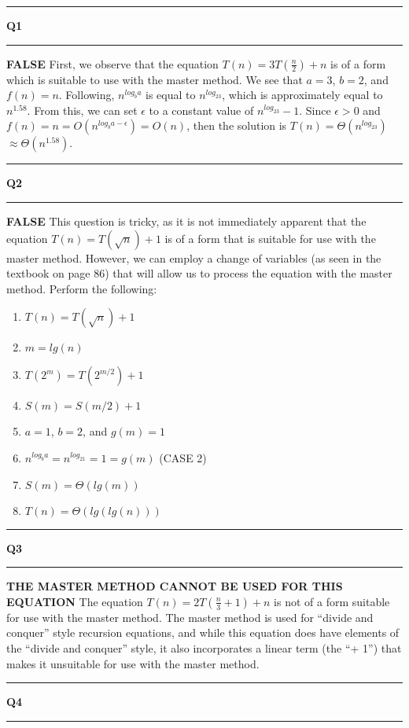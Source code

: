 \documentclass[11pt]{article}
\newcommand\question[2]{\vspace{.25in}\hrule\textbf{#1 #2}\vspace{.5em}\hrule\vspace{.10in}}
\begin{document}
\raggedright
\newcommand\NAME{Sean Connor (443-414-5111)}  %
\newcommand\HWNUM{2}              %

\question{Q1}{}
\textbf{FALSE} First, we observe that the equation $T(n) = 3T(\frac{n}{2})+n$ is of a form which is suitable to use with the master method. We see that $a=3$, $b=2$, and $f(n)=n$. Following, $n^{log_ba}$ is equal to $n^{log_23}$, which is approximately equal to $n^{1.58}$. From this, we can set $\epsilon$ to a constant value of $n^{log_23} - 1$. Since $\epsilon > 0$ and $f(n)= n = O(n^{log_ba-\epsilon}) = O(n)$, then the solution is $T(n)=\Theta(n^{log_23})$ $\approx \Theta(n^{1.58})$.

\question{Q2}{}
\textbf{FALSE} This question is tricky, as it is not immediately apparent that the equation $T(n) = T(\sqrt{n})+1$ is of a form that is suitable for use with the master method. However, we can employ a change of variables (as seen in the textbook on page 86) that will allow us to process the equation with the master method. Perform the following:
\begin{enumerate}
\item $T(n) = T(\sqrt{n})+1$
\item $m = lg(n)$
\item $T(2^m) = T(2^{m/2}) + 1$
\item $S(m) = S(m/2) + 1$
\item $a = 1$, $b = 2$, and $g(m) = 1$
\item $n^{log_ba} = n^{log_21} = 1 = g(m)$ (CASE 2)
\item $S(m) = \Theta(lg(m))$
\item $T(n) = \Theta(lg(lg(n)))$
\end{enumerate}

\question{Q3}{}
\textbf{THE MASTER METHOD CANNOT BE USED FOR THIS EQUATION} The equation $T(n) = 2T(\frac{n}{3} + 1) + n$ is not of a form suitable for use with the master method. The master method is used for ``divide and conquer'' style recursion equations, and while this equation does have elements of the ``divide and conquer'' style, it also incorporates a linear term (the ``+ 1'') that makes it unsuitable for use with the master method.

\question{Q4}{}
\end{document}

